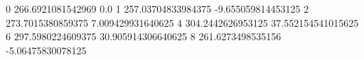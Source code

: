 0 266.6921081542969 0.0
1 257.03704833984375 -9.655059814453125
2 273.7015380859375 7.009429931640625
4 304.2442626953125 37.552154541015625
6 297.5980224609375 30.905914306640625
8 261.6273498535156 -5.06475830078125
